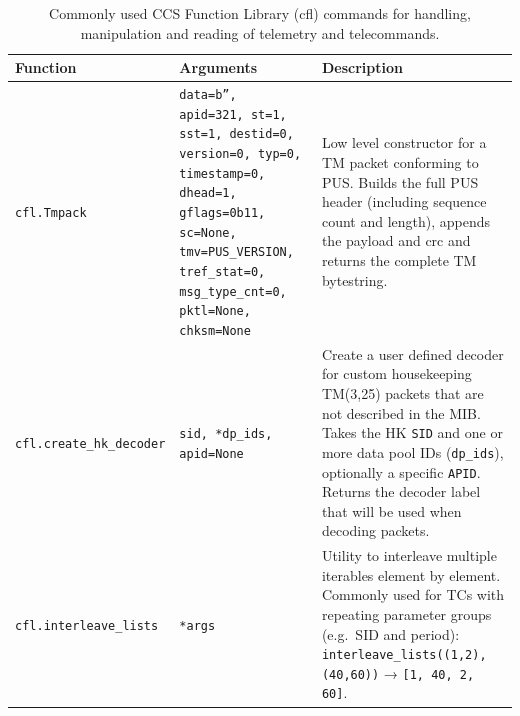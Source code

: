 \begin{table}[h!]
\centering
\renewcommand{\arraystretch}{1.3}
\setlength{\tabcolsep}{8pt}
\begin{tabular}{p{4cm} p{5cm} p{6cm}}
\hline
\textbf{Function} & \textbf{Arguments} & \textbf{Description} \\ 
\hline

\texttt{cfl.Tmpack} & \texttt{data=b'', apid=321, st=1, sst=1, destid=0, version=0, typ=0, timestamp=0, dhead=1, gflags=0b11, sc=None, tmv=PUS\_VERSION, tref\_stat=0, msg\_type\_cnt=0, pktl=None, chksm=None} &
Low level constructor for a TM packet conforming to PUS.  
Builds the full PUS header (including sequence count and length), appends the payload and crc and returns the complete TM bytestring.  \\

\texttt{cfl.create\_hk\_decoder} & \texttt{sid, *dp\_ids, apid=None} &
Create a user defined decoder for custom housekeeping TM(3,25) packets that are not described in the MIB.  
Takes the HK \texttt{SID} and one or more data pool IDs (\texttt{dp\_ids}), optionally a specific \texttt{APID}.  
Returns the decoder label that will be used when decoding packets. \\

\texttt{cfl.interleave\_lists} & \texttt{*args} &
Utility to interleave multiple iterables element by element.  
Commonly used for TCs with repeating parameter groups (e.g.\ SID and period):  
\texttt{interleave\_lists((1,2), (40,60))} → \texttt{[1, 40, 2, 60]}. \\

\hline
\end{tabular}
\caption{Commonly used CCS Function Library (cfl) commands for handling, manipulation and reading of telemetry and telecommands.}
\end{table}


